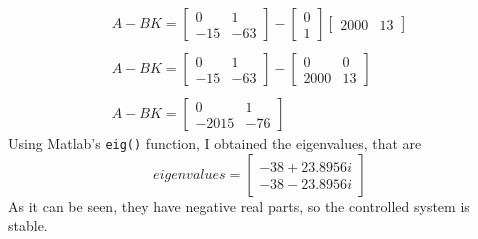 \documentclass[a4paper,12pt]{article}
\begin{document}
        \begin{eqnarray*}
            A-BK = 
            \begin{bmatrix}
                0 & 1 \\
                -15 & -63
            \end{bmatrix}
            -
            \begin{bmatrix}
                0 \\
                1
            \end{bmatrix}
            \begin{bmatrix}
                2000 & 13
            \end{bmatrix}\\
            \\
            A-BK = 
            \begin{bmatrix}
                0 & 1 \\
                -15 & -63
            \end{bmatrix}
            -
            \begin{bmatrix}
                0 & 0\\
                2000 & 13
            \end{bmatrix}\\
            \\
            A-BK = 
            \begin{bmatrix}
                0 & 1 \\
                -2015 & -76
            \end{bmatrix}
        \end{eqnarray*}
        Using Matlab's \texttt{eig()} function, I obtained the eigenvalues, that 
        are
        \begin{equation*}
            eigenvalues = 
            \begin{bmatrix}
                -38 + 23.8956i\\
                -38 - 23.8956i
            \end{bmatrix}
        \end{equation*}
        As it can be seen, they have negative real parts, so the controlled system
        is stable.
\end{document}
